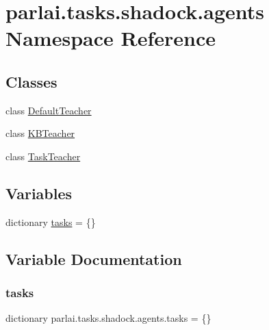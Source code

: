 \hypertarget{namespaceparlai_1_1tasks_1_1shadock_1_1agents}{}\section{parlai.\+tasks.\+shadock.\+agents Namespace Reference}
\label{namespaceparlai_1_1tasks_1_1shadock_1_1agents}
\subsection*{Classes}
\begin{DoxyCompactItemize}
\item 
class \hyperlink{classparlai_1_1tasks_1_1shadock_1_1agents_1_1DefaultTeacher}{Default\+Teacher}
\item 
class \hyperlink{classparlai_1_1tasks_1_1shadock_1_1agents_1_1KBTeacher}{K\+B\+Teacher}
\item 
class \hyperlink{classparlai_1_1tasks_1_1shadock_1_1agents_1_1TaskTeacher}{Task\+Teacher}
\end{DoxyCompactItemize}
\subsection*{Variables}
\begin{DoxyCompactItemize}
\item 
dictionary \hyperlink{namespaceparlai_1_1tasks_1_1shadock_1_1agents_aa4f4a67f5725a72dba998a229e3ba4dc}{tasks} = \{\}
\end{DoxyCompactItemize}


\subsection{Variable Documentation}
\mbox{\label{namespaceparlai_1_1tasks_1_1shadock_1_1agents_aa4f4a67f5725a72dba998a229e3ba4dc}} 
\subsubsection{\texorpdfstring{tasks}{tasks}}
{\footnotesize\ttfamily dictionary parlai.\+tasks.\+shadock.\+agents.\+tasks = \{\}}

